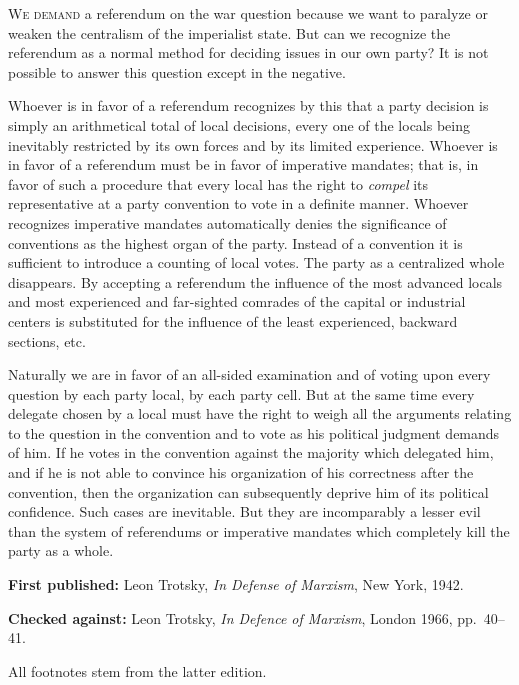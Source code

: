 
\textsc{We demand} a referendum on the war question because we want to paralyze or weaken the centralism of the imperialist state. But can we recognize the referendum as a normal method for deciding issues in our own party? It is not possible to answer this question except in the negative.

Whoever is in favor of a referendum recognizes by this that a party decision is simply an arithmetical total of local decisions, every one of the locals being inevitably restricted by its own forces and by its limited experience. Whoever is in favor of a referendum must be in favor of imperative mandates; that is, in favor of such a procedure that every local has the right to \emph{compel} its representative at a party convention to vote in a definite manner. Whoever recognizes imperative mandates automatically denies the significance of conventions as the highest organ of the party. Instead of a convention it is sufficient to introduce a counting of local votes. The party as a centralized whole disappears. By accepting a referendum the influence of the most advanced locals and most experienced and far-sighted comrades of the capital or industrial centers is substituted for the influence of the least experienced, backward sections, etc.

Naturally we are in favor of an all-sided examination and of voting upon every question by each party local, by each party cell. But at the same time every delegate chosen by a local must have the right to weigh all the arguments relating to the question in the convention and to vote as his political judgment demands of him. If he votes in the convention against the majority which delegated him, and if he is not able to convince his organization of his correctness after the convention, then the organization can subsequently deprive him of its political confidence. Such cases are inevitable. But they are incomparably a lesser evil than the system of referendums or imperative mandates which completely kill the party as a whole.


\begin{letterinfo}
	\textbf{First published:} Leon Trotsky, \emph{In Defense of Marxism}, New York, 1942.
	
	\textbf{Checked against:} Leon Trotsky, \emph{In Defence of Marxism}, London 1966, pp.~40--41.
	
	All footnotes stem from the latter edition.
\end{letterinfo}